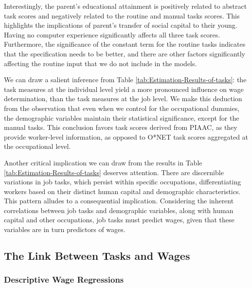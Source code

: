 \begin{onehalfspace}
Interestingly, the parent's educational attainment is positively related
to abstract task scores and negatively related to the routine and
manual tasks scores. This highlights the implications of parent's
transfer of social capital to their young. Having no computer experience
significantly affects all three task scores. Furthermore, the significance
of the constant term for the routine tasks indicates that the specification
needs to be better, and there are other factors significantly affecting
the routine input that we do not include in the models.

We can draw a salient inference from Table \ref{tab:Estimation-Results-of-tasks}:
the task measures at the individual level yield a more pronounced
influence on wage determination, than the task measures at the job
level. We make this deduction from the observation that even when
we control for the occupational dummies, the demographic variables
maintain their statistical significance, except for the manual tasks.
This conclusion favors task scores derived from PIAAC, as they provide
worker-level information, as opposed to O{*}NET task scores aggregated
at the occupational level.

Another critical implication we can draw from the results in Table
\ref{tab:Estimation-Results-of-tasks} deserves attention. There are
discernible variations in job tasks, which persist within specific
occupations, differentiating workers based on their distinct human
capital and demographic characteristics. This pattern alludes to a
consequential implication. Considering the inherent correlations between
job tasks and demographic variables, along with human capital and
other occupations, job tasks must predict wages, given that these
variables are in turn predictors of wages.
\end{onehalfspace}

\subsection{The Link Between Tasks and Wages}

\subsubsection{Descriptive Wage Regressions}

